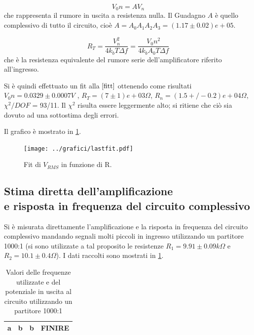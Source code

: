 \documentclass[a4paper,10pt]{article}
\begin{document}
\begin{equation}
V_0n = A V_n
\label{resnull}
\end{equation}
 che rappresenta il rumore in uscita a resistenza nulla. Il Guadagno $A$ è quello complessivo di tutto il circuito, cioè $A = A_0 A_1 A_2 A_3 = (1.17\pm0.02)e+05 $.
 
 \begin{equation}
 R_T = \frac{V_n^2}{4k_b T \Delta f} = \frac{V_0n^2}{4k_b A_0 T \Delta f}
 \label{kb}
 \end{equation}
  che è la resistenza equivalente del rumore serie dell'amplificatore riferito all'ingresso.

Si è quindi effettuato un fit alla $\eqref{fitt}$ ottenendo come risultati $V_0n = 0.0329\pm0.0007 V$ , $R_T = (7\pm1)e+03 \Omega $, $R_n = (1.5+/-0.2)e+04 \Omega$, $\chi ^2 /DOF$ = 93/11. Il $\chi ^2$ risulta essere leggermente alto; si ritiene che ciò sia dovuto ad una sottostima degli errori.

Il grafico è mostrato in \cref{fig:lastfit}.


\begin{figure}[H]
	\centering
	\texttt{[image: ../grafici/lastfit.pdf]}
	\caption{Fit di $V_{RMS}$ in funzione di R.}
	\label{fig:lastfit}
\end{figure}



\subsection{Stima diretta dell'amplificazione \\e risposta in frequenza del circuito complessivo}
Si è misurata direttamente l'amplificazione e la risposta in frequenza del circuito complessivo mandando segnali molti piccoli in ingresso utilizzando un partitore 1000:1 (si sono utilizzate a tal proposito le resistenze $R_1 = 9.91\pm0.09 k\Omega $ e $R_2 = 10.1\pm0.4 \Omega$).
I dati raccolti sono mostrati in \cref{tab:partit}.

\begin{table}[H]
	\centering
	\begin{tabular}{cccc}
		\hline
a&b&b&FINIRE\\
		\hline
	\end{tabular}
	\caption{Valori delle frequenze utilizzate e del potenziale in uscita al circuito utilizzando un partitore 1000:1}
	\label{tab:partit}
\end{table}
\end{document}
